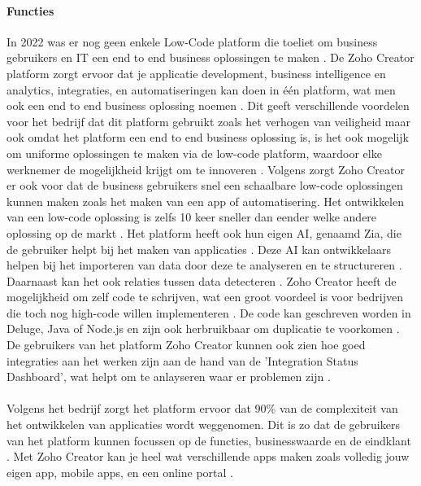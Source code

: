 \paragraph{Functies}
In 2022 was er nog geen enkele Low-Code platform die toeliet om business gebruikers en IT een end to end business oplossingen te maken \autocite{Computer2022}.
De Zoho Creator platform zorgt ervoor dat je applicatie development, business intelligence en analytics, integraties, en automatiseringen kan doen in één platform, wat men ook een end to end business oplossing noemen \autocite{Computer2022}.
Dit geeft verschillende voordelen voor het bedrijf dat dit platform gebruikt zoals het verhogen van veiligheid maar ook omdat het platform een end to end business oplossing is, is het ook mogelijk om uniforme oplossingen te maken via de low-code platform,
waardoor elke werknemer de mogelijkheid krijgt om te innoveren \autocite{Computer2022}. Volgens \textcite{Computer2022} zorgt Zoho Creator er ook voor dat de business gebruikers snel een schaalbare low-code oplossingen kunnen maken zoals het maken van een app of automatisering.
Het ontwikkelen van een low-code oplossing is zelfs 10 keer sneller dan eender welke andere oplossing op de markt \autocite{Computer2022}. Het platform heeft ook hun eigen AI, genaamd Zia, die de gebruiker helpt bij het maken van applicaties \autocite{Computer2022}. Deze AI
kan ontwikkelaars helpen bij het importeren van data door deze te analyseren en te structureren \autocite{Computer2022}. Daarnaast kan het ook relaties tussen data detecteren \autocite{Computer2022}. 
Zoho Creator heeft de mogelijkheid om zelf code te schrijven, wat een groot voordeel is voor bedrijven die toch nog high-code willen implementeren \autocite{Computer2022}. 
De code kan geschreven worden in Deluge, Java of Node.js en zijn ook herbruikbaar om duplicatie te voorkomen \autocite{Computer2022}.
De gebruikers van het platform Zoho Creator kunnen ook zien hoe goed integraties aan het werken zijn aan de hand van de 'Integration Status Dashboard', wat helpt om te anlayseren waar er problemen zijn \autocite{Computer2022}.
\\ %
\\
Volgens het bedrijf \autocite{ZohoCorporation2024b} zorgt het platform ervoor dat 90\% van de complexiteit van het ontwikkelen van applicaties wordt weggenomen. Dit is zo dat de gebruikers van het platform
kunnen focussen op de functies, businesswaarde en de eindklant \autocite{ZohoCorporation2024b}.  Met Zoho Creator kan je heel wat verschillende apps maken zoals volledig jouw eigen app, mobile apps, en een online portal \autocite{ZohoCorporation2024b}.
